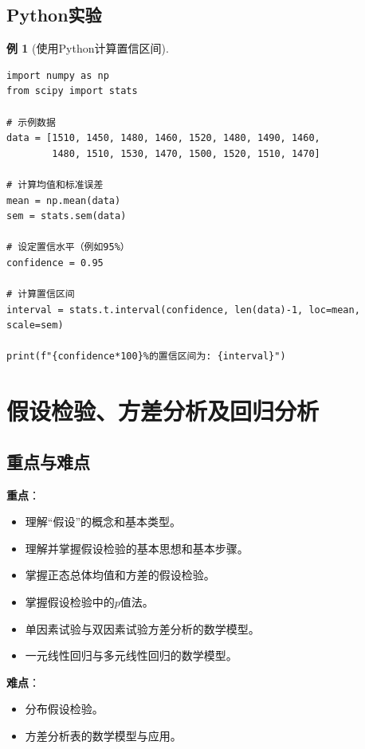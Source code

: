 \documentclass[11pt,a4paper]{report}
\theoremstyle{definition}
\newtheorem{example}{例}[chapter]
\theoremstyle{plain}
\begin{document}
\section{Python实验}

\begin{example}[使用Python计算置信区间]
\begin{verbatim}
import numpy as np
from scipy import stats

# 示例数据
data = [1510, 1450, 1480, 1460, 1520, 1480, 1490, 1460,
        1480, 1510, 1530, 1470, 1500, 1520, 1510, 1470]

# 计算均值和标准误差
mean = np.mean(data)
sem = stats.sem(data)

# 设定置信水平（例如95%）
confidence = 0.95

# 计算置信区间
interval = stats.t.interval(confidence, len(data)-1, loc=mean, scale=sem)

print(f"{confidence*100}%的置信区间为: {interval}")
\end{verbatim}
\end{example}

\newpage
\chapter{假设检验、方差分析及回归分析}

\section{重点与难点}

\textbf{重点}：
\begin{itemize}[leftmargin=2em]
    \item 理解“假设”的概念和基本类型。
    \item 理解并掌握假设检验的基本思想和基本步骤。
    \item 掌握正态总体均值和方差的假设检验。
    \item 掌握假设检验中的$p$值法。
    \item 单因素试验与双因素试验方差分析的数学模型。
    \item 一元线性回归与多元线性回归的数学模型。
\end{itemize}

\textbf{难点}：
\begin{itemize}[leftmargin=2em]
    \item 分布假设检验。
    \item 方差分析表的数学模型与应用。
\end{itemize}
\end{document}

